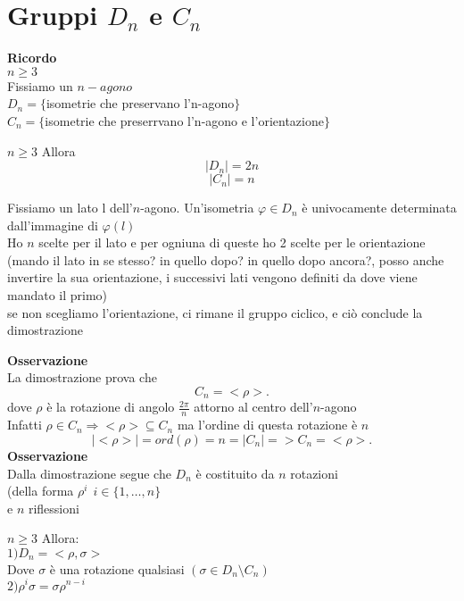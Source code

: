\documentclass[12px]{article}
\begin{document}
 \section{Gruppi $D_n$ e $C_n$}
  \textbf{Ricordo}\\
  $n\geq 3$\\
  Fissiamo un  $n-agono$ \\
  $D_n = \lbrace$isometrie che preservano l'n-agono$\rbrace$\\
   $C_n  = \lbrace$isometrie che preserrvano l'n-agono e l'orientazione$\rbrace$\\
 \begin{teo}
 	$n\geq 3$ Allora\\
	\[|D_n| = 2n\]
\[|C_n| = n\]
 \end{teo}
 \begin{dimo}
	 Fissiamo un lato l dell'$n$-agono. Un'isometria $ \varphi\in D_n$ è univocamente determinata dall'immagine di $ \varphi(l)$\\
	 Ho $n$ scelte per il lato e per ogniuna di queste ho 2 scelte per le orientazione (mando il lato in se stesso? in quello dopo? in quello dopo ancora?, posso anche invertire la sua orientazione, i successivi lati vengono definiti da dove viene mandato il primo)\\
	 se non scegliamo l'orientazione, ci rimane il gruppo ciclico, e ciò conclude la dimostrazione
 \end{dimo}
 \textbf{Osservazione}\\
 La dimostrazione prova che
 \[
  C_n = <\rho>
 .\]
 dove $\rho$ è la rotazione di angolo $\frac {2\pi}{n}$ attorno al centro dell'$n$-agono\\
 Infatti $\rho\in C_n \Rightarrow <\rho>\subseteq C_n$ ma l'ordine di questa rotazione è $n$
  \[
 |<\rho>| = ord(\rho) = n = |C_n| => C_n = <\rho>
 .\] 
 \textbf{Osservazione}\\
 Dalla dimostrazione segue che $D_n$ è costituito da $n$ rotazioni \\(della forma $\rho^i \ \ i\in\lbrace 1,\ldots, n\rbrace$ \\
 e $n$ riflessioni\\
 \begin{prop}
 	$n\geq 3$ Allora:\\
	 $1)D_n = <\rho,\sigma >$\\
	 Dove  $\sigma$ è una rotazione qualsiasi  $(\sigma \in D_n\setminus C_n)$ \\
	 $2)\rho^i \sigma = \sigma \rho^{n-i}$ 
 \end{prop}
\end{document}

